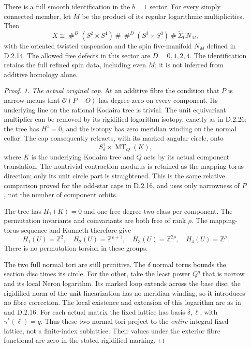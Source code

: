 There is a full smooth identification in the $b=1$ sector.
For every simply connected member, let $M$ be the product of
its regular logarithmic multiplicities. Then
\[
 X\cong
 \mathop{\#}^{D}(S^2\times S^4)
 \ \#\ \mathop{\#}^{D}(S^3\times S^3)
 \ \#\ \widetilde\Sigma_0 N_M,                             \tag{D.OD3}
\]
with the oriented twisted suspension and the spin five-manifold
$N_M$ defined in D.2.14. The allowed free defects in this sector
are $D=0,1,2,4$. The identification retains the full refined
spin data, including even $M$; it is not inferred from
additive homology alone.

\begin{proof}
\emph{1. The actual original cap.}
At an additive fibre the condition that $P$ is narrow means
that $\mathcal O(P-O)$ has degree zero on every component.
Its underlying line on the rational Kodaira tree is trivial.
The unit equivariant multiplier can be removed by its
rigidified logarithm isotopy, exactly as in D.2.26; the tree
has $H^1=0$, and the isotopy has zero meridian winding on the
normal collar. The cap consequently retracts, with its marked
angular circle, onto
\[
 S^1_\delta\times\operatorname{MT}_Q(K),
\]
where $K$ is the underlying Kodaira tree and $Q$ acts by its
actual component translation. The nontrivial contraction
modulus is retained as the mapping-torus direction; only its
unit circle part is straightened. This is the same relative
comparison proved for the odd-star caps in D.2.16, and uses
only narrowness of $P$, not the number of component orbits.

The tree has $H_1(K)=0$ and one free degree-two class per
component. The permutation invariants and coinvariants are
both free of rank $\rho$. The mapping-torus sequence and
Kunneth therefore give
\[
 H_1(U)=\mathbb Z^2,\quad H_2(U)=\mathbb Z^{\rho+1},\quad
 H_3(U)=\mathbb Z^{2\rho},\quad H_4(U)=\mathbb Z^\rho.
                                                               \tag{D.OD4}
\]
There is no permutation torsion in these groups.

The two full normal tori are still primitive. The $\delta$
normal torus bounds the section disc times its circle. For
the other, take the least power $Q^q$ that is narrow and its
local Neron logarithm. Its marked loop extends across the
base disc; the rigidified norm of the unit linearization has
no meridian winding, so it introduces no fibre correction.
The local existence and extension of this logarithm are as
in \cite[Section 2.4, equation (2.2)]{manUU21} and D.2.16.
For each actual matrix the fixed lattice has basis
$\delta,\ell$, with $\gamma^*(\ell)=q$. Thus these two
normal tori project to the \emph{entire} integral fixed
lattice, not a finite-index sublattice. Their values under
the exterior fibre functional are zero in the stated
rigidified marking.


\end{proof}
